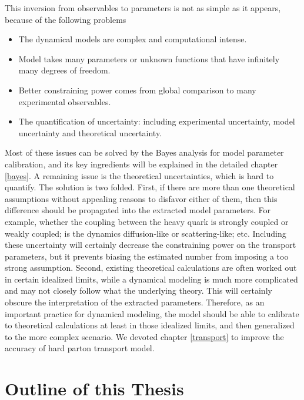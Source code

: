 This inversion from observables to parameters is not as simple as it appears, because of the following problems
\begin{itemize}
\item The dynamical models are complex and computational intense.
\item Model takes many parameters or unknown functions that have infinitely many degrees of freedom.
\item Better constraining power comes from global comparison to many experimental observables.
\item The quantification of uncertainty: including experimental uncertainty, model uncertainty and theoretical uncertainty.
\end{itemize}
Most of these issues can be solved by the Bayes analysis for model parameter calibration, and its key ingredients will be explained in the detailed chapter \ref{bayes}.
A remaining issue is the theoretical uncertainties, which is hard to quantify.
The solution is two folded. 
First, if there are more than one theoretical assumptions without appealing reasons to disfavor either of them, then this difference should be propagated into the extracted model parameters.
For example, whether the coupling between the heavy quark is strongly coupled or weakly coupled; is the dynamics diffusion-like or scattering-like; etc.
Including these uncertainty will certainly decrease the constraining power on the transport parameters, but it prevents biasing the estimated number from imposing a too strong assumption.
Second, existing theoretical calculations are often worked out in certain idealized limits, while a dynamical modeling is much more complicated and may not closely follow what the underlying theory.
This will certainly obscure the interpretation of the extracted parameters.
Therefore, as an important practice for dynamical modeling, the model should be able to calibrate to theoretical calculations at least in those idealized limits, and then generalized to the more complex scenario.
We devoted chapter \ref{transport} to improve the accuracy of hard parton transport model.

\section{Outline of this Thesis}

